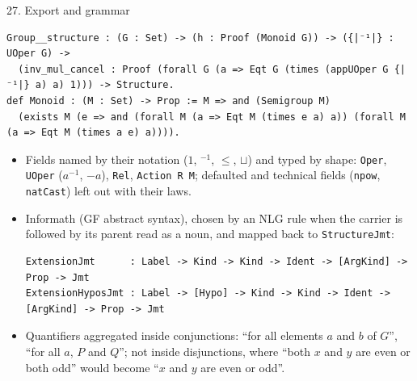 \documentclass[10pt,aspectratio=169]{beamer}
\newcommand{\bad}[1]{\textcolor{warn}{#1}}
\newcommand{\ok}[1]{\textcolor{good}{#1}}
\begin{document}
\begin{frame}[fragile]{27. Export and grammar}
  \footnotesize
\begin{lstlisting}
Group__structure : (G : Set) -> (h : Proof (Monoid G)) -> ({|⁻¹|} : UOper G) ->
  (inv_mul_cancel : Proof (forall G (a => Eqt G (times (appUOper G {|⁻¹|} a) a) 1))) -> Structure.
def Monoid : (M : Set) -> Prop := M => and (Semigroup M)
  (exists M (e => and (forall M (a => Eqt M (times e a) a)) (forall M (a => Eqt M (times a e) a)))).
\end{lstlisting}
  \begin{itemize}
    \item Fields \ok{named by their notation} ($1$, ${}^{-1}$, $\leq$, $\sqcup$) and typed by
          shape: \texttt{Oper}, \texttt{UOper} ($a^{-1}$, $-a$), \texttt{Rel}, \texttt{Action
          R M}; defaulted and technical fields (\texttt{npow}, \texttt{natCast}) left out with
          their laws.
    \item Informath (GF abstract syntax), chosen by an NLG rule when the carrier is followed
          by its parent read as a noun, and mapped back to \texttt{StructureJmt}:
\begin{lstlisting}
ExtensionJmt      : Label -> Kind -> Kind -> Ident -> [ArgKind] -> Prop -> Jmt
ExtensionHyposJmt : Label -> [Hypo] -> Kind -> Kind -> Ident -> [ArgKind] -> Prop -> Jmt
\end{lstlisting}
    \item Quantifiers aggregated inside conjunctions: ``for all elements $a$ and $b$ of $G$'',
          ``for all $a$, $P$ and $Q$''; \bad{not} inside disjunctions, where ``both $x$ and $y$
          are even or both odd'' would become ``$x$ and $y$ are even or odd''.
  \end{itemize}
\end{frame}
\end{document}
